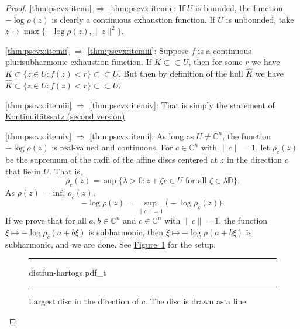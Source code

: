 \documentclass[12pt,openany]{book}
\newcommand{\snorm}[1]{\lVert {#1} \rVert}
\newcommand{\C}{{\mathbb{C}}}
\newcommand{\D}{{\mathbb{D}}}
\theoremstyle{plain}
\theoremstyle{remark}
\theoremstyle{definition}
\newenvironment{myfig}{%
\begin{figure}[h!t]
\noindent\rule{\textwidth}{0.5pt}\vspace{12pt}\par\centering}%
{\par\noindent\rule{\textwidth}{0.5pt}
\end{figure}}
\theoremstyle{exercise}
\theoremstyle{example}
\newcommand{\figureref}[1]{\hyperref[#1]{Figure~\ref*{#1}}}
\begin{document}
\begin{proof}
\ref{thm:pscvx:itemi}
$\Rightarrow$
\ref{thm:pscvx:itemii}:
If $U$ is bounded,
the function $-\log \rho(z)$ is clearly a continuous exhaustion function.
If $U$ is unbounded, take
$z \mapsto \max \{ -\log \rho(z) , \snorm{z}^2 \}$.

\ref{thm:pscvx:itemii}
$\Rightarrow$
\ref{thm:pscvx:itemiii}:
Suppose $f$ is a continuous plurisubharmonic exhaustion function.
If $K \subset \subset U$, then for some $r$ we have
$K \subset \{ z \in U : f(z) < r \} \subset \subset U$.
But then by definition of the hull $\widehat{K}$ we have
$\widehat{K} \subset \{ z \in U : f(z) < r \} \subset \subset U$.

\ref{thm:pscvx:itemiii}
$\Rightarrow$
\ref{thm:pscvx:itemiv}:
That is simply the statement of
\hyperref[thm:contprinciple2]{Kontinuit\"atssatz (second version)}.

\ref{thm:pscvx:itemiv}
$\Rightarrow$
\ref{thm:pscvx:itemi}:
As long as $U \not= \C^n$,
the function $-\log \rho(z)$ is real-valued and continuous.
For $c \in \C^n$ with $\snorm{c}=1$, let
$\rho_c(z)$ be the supremum of the radii of the affine discs centered at $z$
in the direction $c$ that lie in $U$.  That is,
\begin{equation*}
\rho_c(z) =
\sup \bigl\{ \lambda > 0 :
z+ \zeta c \in U \text{ for all $\zeta \in \lambda\D$} \bigr\} .
\end{equation*}
As $\rho(z) = \inf_c \rho_c(z)$,
\begin{equation*}
- \log \rho(z) = \sup_{\snorm{c}=1} \bigl(-\log \rho_c(z)\bigr) .
\end{equation*}
If we prove that for all $a, b \in \C^n$ and
$c \in \C^n$ with $\snorm{c}=1$, the function $\xi \mapsto -\log \rho_c(a+b\xi)$ is
subharmonic, then $\xi \mapsto - \log \rho(a+b\xi)$ is subharmonic,
and we are done.
See \figureref{fig:distfun-hartogs} for the setup.
\begin{myfig}
{distfun-hartogs.pdf_t}
\caption{Largest disc in the direction of $c$.
The disc is drawn as a line.\label{fig:distfun-hartogs}}
\end{myfig}


\end{proof}
\end{document}
